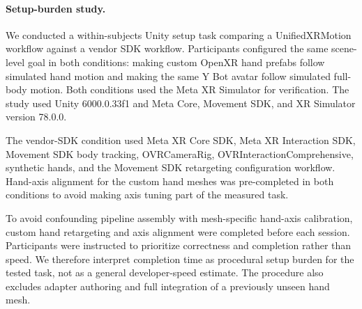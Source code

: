 \documentclass[runningheads]{llncs}
\begin{document}
\paragraph{Setup-burden study.}
We conducted a within-subjects Unity setup task comparing a UnifiedXRMotion workflow against a vendor SDK workflow. Participants configured the same scene-level goal in both conditions: making custom OpenXR hand prefabs follow simulated hand motion and making the same Y Bot avatar follow simulated full-body motion. Both conditions used the Meta XR Simulator for verification. The study used Unity 6000.0.33f1 and Meta Core, Movement SDK, and XR Simulator version 78.0.0.

The vendor-SDK condition used Meta XR Core SDK, Meta XR Interaction SDK, Movement SDK body tracking, OVRCameraRig, OVRInteraction\allowbreak{}Comprehensive, synthetic hands, and the Movement SDK retargeting configuration workflow. Hand-axis alignment for the custom hand meshes was pre-completed in both conditions to avoid making axis tuning part of the measured task.

To avoid confounding pipeline assembly with mesh-specific hand-axis calibration, custom hand retargeting and axis alignment were completed before each session. Participants were instructed to prioritize correctness and completion rather than speed. We therefore interpret completion time as procedural setup burden for the tested task, not as a general developer-speed estimate. The procedure also excludes adapter authoring and full integration of a previously unseen hand mesh.
\end{document}
